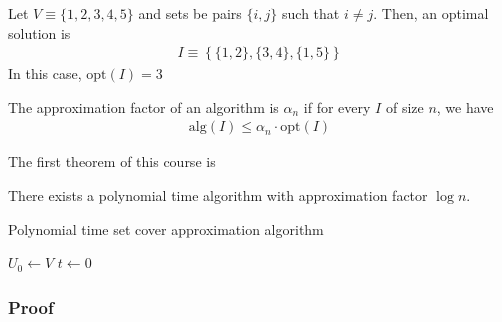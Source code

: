 \begin{example}
    Let $V \equiv \{ 1, 2, 3, 4, 5 \}$ and sets be pairs $\{ i, j \}$ such that $i \ne j$. Then, an optimal solution is
    \begin{align}
        I \equiv \left\{ \{ 1, 2 \}, \{ 3, 4 \}, \{ 1, 5 \} \right\}
    \end{align}
    In this case, $\text{opt}(I) = 3$
\end{example}

\begin{definition}
    The approximation factor of an algorithm is $\alpha_n$ if for every $I$ of size $n$, we have
    \begin{align}
        \text{alg}(I) \le \alpha_n \cdot \text{opt}(I)
    \end{align}
\end{definition}

The first theorem of this course is
\begin{theorem}
    There exists a polynomial time algorithm with approximation factor $\log n$.
    \begin{algorithm}[H]
        \caption{Polynomial time set cover approximation algorithm}
        \DontPrintSemicolon
        $U_0 \leftarrow V$ 
        $t \leftarrow 0$ 
    \end{algorithm}
\end{theorem}

\subsubsection{Proof}


